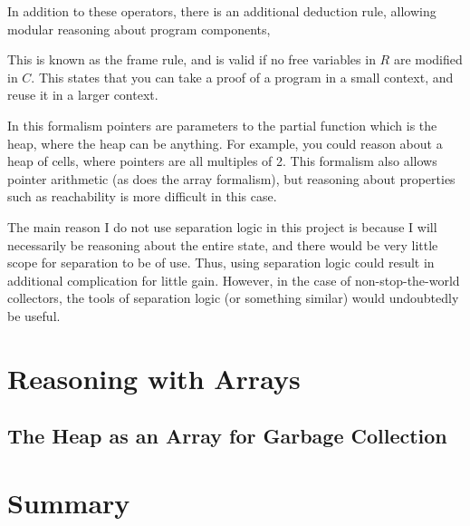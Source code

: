 In addition to these operators, there is an additional deduction rule,
allowing modular reasoning about program components,

\begin{prooftree}
\end{prooftree}

This is known as the frame rule, and is valid if no free variables in
$R$ are modified in $C$. This states that you can take a proof of a
program in a small context, and reuse it in a larger context.

In this formalism pointers are parameters to the partial function
which is the heap, where the heap can be anything. For example, you
could reason about a heap of cells, where pointers are all multiples
of 2. This formalism also allows pointer arithmetic (as does the array
formalism), but reasoning about properties such as reachability is
more difficult in this case.

The main reason I do not use separation logic in this project is
because I will necessarily be reasoning about the entire state, and
there would be very little scope for separation to be of use. Thus,
using separation logic could result in additional complication for
little gain. However, in the case of non-stop-the-world collectors,
the tools of separation logic (or something similar) would undoubtedly
be useful.

\section{Reasoning with Arrays}
\label{sec:heap-arrays}






\subsection{The Heap as an Array for Garbage Collection}
\label{sec:heap-arrays-gc}


\section{Summary}
\label{sec:heap-summary}

